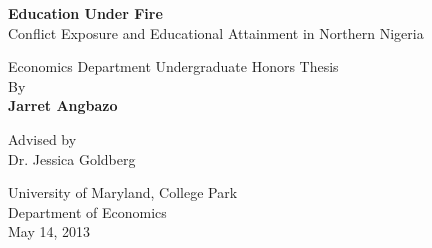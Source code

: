 \documentclass[12pt, letterpaper]{article}
\begin{document}
\begin{titlepage}
    \begin{center}
        \vspace*{1in}

        {\LARGE\bfseries Education Under Fire}\\[0.5em]
        {\large Conflict Exposure and Educational Attainment in Northern Nigeria}

        \vspace{1.5in}

        {\large Economics Department Undergraduate Honors Thesis}\\[0.5em]
        {\large By}\\[0.5em]
        {\large\bfseries Jarret Angbazo}

        \vspace{1in}

        {\large Advised by}\\[0.5em]
        {\large Dr. Jessica Goldberg}

        \vspace{1in}

        {\large University of Maryland, College Park}\\[0.3em]
        {\large Department of Economics}\\[0.5em]
        {\large May 14, 2013}

        \vspace{1in}

        \begin{abstract}
            \singlespacing
            This paper examines the effect of violent conflict on the
            educational attainment and school enrollment of children in
            Nigeria. Using data from the 2010 Nigeria Education Data Survey
            (NEDS) and geocoded violence data from the Uppsala Conflict Data
            Program (UCDP) spanning 1999--2010, I estimate OLS models with
            and without LGA fixed effects to identify whether exposure to
            violence at different stages of childhood affects the probability
            of school enrollment and the number of years of schooling
            completed. I find that exposure to violence during early childhood
            (ages 0--3) and preschool age (3--6) is associated with a
            reduced likelihood of current school enrollment, while the effects
            on total years of schooling are mixed and sensitive to model
            specification. Results confirm well-documented gender and
            urban-rural disparities in educational attainment. These findings
            motivate continued investment in school access and protection of
            education during conflict.

            \vspace{0.5em}
            \noindent\textbf{Keywords:} conflict, education, Nigeria, Boko
            Haram, school enrollment, UCDP, OLS, fixed effects
        \end{abstract}
    \end{center}
\end{titlepage}
\end{document}
